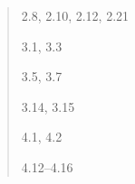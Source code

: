 \documentclass[12pt]{extarticle}
\begin{document}
\begin{multicols*}{3}
\begin{minipage}{\columnwidth}
\begin{quote}
2.8, 2.10, 2.12, 2.21
 
3.1, 3.3
 
3.5, 3.7
 
3.14, 3.15
 
4.1, 4.2
 
4.12--4.16
 
\end{quote}
\end{minipage}

 

\end{multicols*}
\end{document}
